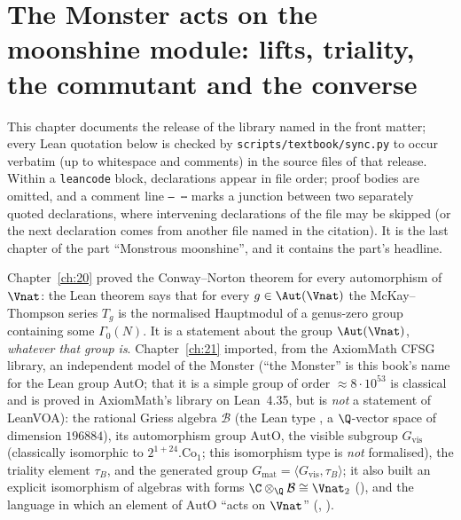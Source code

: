 \chapter{The Monster acts on the moonshine module: lifts, triality, the commutant and the converse}\label{ch:22}

\providecommand{\chtwentytwoM}{\mathbb{M}}
\providecommand{\chtwentytwoB}{\mathcal{B}}
\providecommand{\chtwentytwoA}{\mathcal{A}}
\providecommand{\chtwentytwoX}{\mathcal{X}}
\providecommand{\chtwentytwoW}{\mathcal{W}}
\providecommand{\chtwentytwoGvis}{G_{\mathrm{vis}}}
\providecommand{\chtwentytwoGmat}{G_{\mathrm{mat}}}
\providecommand{\chtwentytwoAutO}{\mathrm{AutO}}
\providecommand{\chtwentytwoCo}{\mathrm{Co}}
\providecommand{\chtwentytwoiota}{\iota_{\natural}}
\providecommand{\chtwentytwolean}[1]{\texttt{\directlua{ local s = "\luaescapestring{\detokenize{#1}}" for piece, sep in string.gmatch(s, "([^_.]*)([_.]?)") do if not (piece == "" and sep == "") then tex.sprint(-2, piece .. sep) if not (sep == "") then tex.sprint(string.char(92) .. "allowbreak{}") end end end}}}
\begingroup\setlength{\emergencystretch}{3em}\sloppy

This chapter documents the release of the library named in the front matter; every Lean quotation below is checked by
\texttt{scripts/textbook/sync.py} to occur verbatim (up to whitespace and comments) in the source files of that release.  Within a
\texttt{leancode} block, declarations appear in file order; proof bodies are omitted, and a comment line
\texttt{-- ⋯} marks a junction between two separately quoted declarations, where intervening declarations of the file may be
skipped (or the next declaration comes from another file named in the citation).  It is the
last chapter of the part ``Monstrous moonshine'', and it contains the part's headline.

Chapter~\ref{ch:20} proved the Conway--Norton theorem for every automorphism of $\Vnat$: the Lean theorem
 says that for every $g\in\Aut(\Vnat)$ the McKay--Thompson series
$T_g$ is the normalised Hauptmodul of a genus-zero group containing some $\Gamma_0(N)$.  It is a statement about
the group $\Aut(\Vnat)$, \emph{whatever that group is}.  Chapter~\ref{ch:21} imported, from the AxiomMath CFSG
library, an independent model of the Monster (``the Monster'' is this book's name for the Lean group
$\chtwentytwoAutO$; that it is a simple group of order $\approx8\cdot10^{53}$ is classical and is proved in AxiomMath's
library on Lean~4.35, but is \emph{not} a statement of LeanVOA): the rational Griess algebra $\chtwentytwoB$ (the Lean type
, a $\Q$-vector space of dimension $196884$), its automorphism group $\chtwentytwoAutO$, the visible
subgroup $\chtwentytwoGvis$ (classically isomorphic to $2^{1+24}.\chtwentytwoCo_1$; this isomorphism type is
\emph{not} formalised), the triality element $\tau_B$, and the generated group
$\chtwentytwoGmat=\langle\chtwentytwoGvis,\tau_B\rangle$; it also built an explicit isomorphism of algebras with forms
$\C\otimes_\Q\chtwentytwoB\cong\Vnat_2$ (), and the language in which an element of
$\chtwentytwoAutO$ ``acts on $\Vnat$'' (, ).

